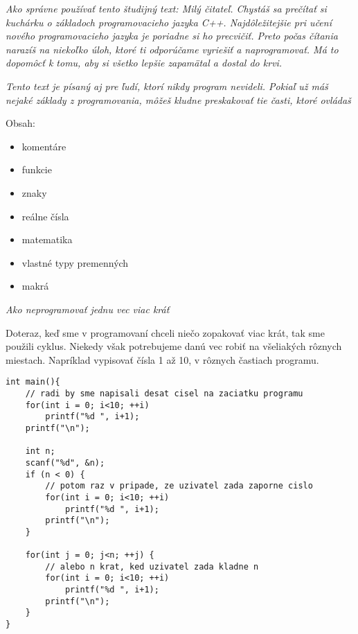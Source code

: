 




\textit{Ako správne používať tento študijný text: Milý čitateľ. Chystáš sa
prečítať si kuchárku o základoch programovacieho jazyka C++. Najdôležitejšie
pri učení nového programovacieho jazyka je poriadne si ho precvičiť. Preto
počas čítania narazíš na niekoľko úloh, ktoré ti odporúčame vyriešiť a
naprogramovať. Má to dopomôcť k tomu, aby si všetko lepšie zapamätal a dostal
do krvi.}

\textit{Tento text je písaný aj pre ľudí, ktorí nikdy program nevideli. Pokiaľ
už máš nejaké základy z programovania, môžeš kludne preskakovať tie časti,
ktoré ovládaš}

Obsah:
\begin{itemize}
    \item komentáre
    \item funkcie
    \item znaky
    \item reálne čísla
    \item matematika
    \item vlastné typy premenných
    \item makrá
\end{itemize}

\medskip


\textit{Ako neprogramovať jednu vec viac kráť}

Doteraz, keď sme v programovaní chceli niečo zopakovať viac krát, tak
sme použili cyklus. Niekedy však potrebujeme danú vec robiť na všeliakých rôznych miestach.
Napríklad vypisovať čísla 1 až 10, v rôznych častiach programu.

\begin{lstlisting}
int main(){
    // radi by sme napisali desat cisel na zaciatku programu
    for(int i = 0; i<10; ++i)
        printf("%d ", i+1);
    printf("\n");

    int n;
    scanf("%d", &n);
    if (n < 0) {
        // potom raz v pripade, ze uzivatel zada zaporne cislo
        for(int i = 0; i<10; ++i)
            printf("%d ", i+1);
        printf("\n");
    }

    for(int j = 0; j<n; ++j) {
        // alebo n krat, ked uzivatel zada kladne n
        for(int i = 0; i<10; ++i)
            printf("%d ", i+1);
        printf("\n");        
    }
}
\end{lstlisting}

